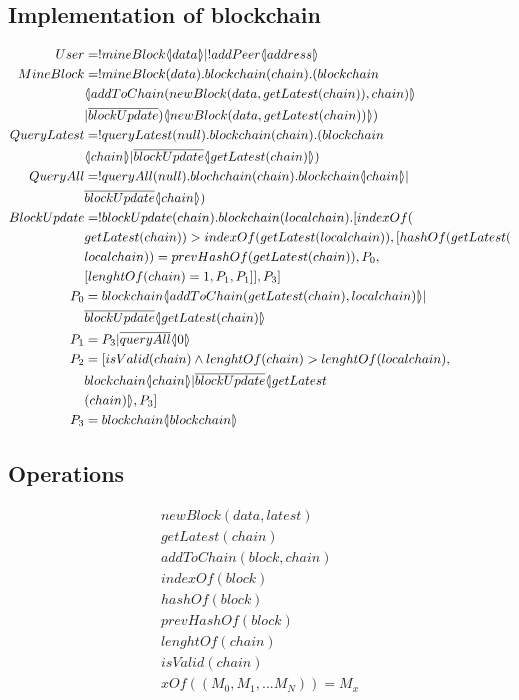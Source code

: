 \subsection{Implementation of blockchain}

\begin{align*}
    User &= !mineBlock \lift{}{data} |!addPeer\lift{}{address}\\
    MineBlock &= !mineBlock(data).blockchain(chain).(blockchain\\
        &\lift{}{addToChain(newBlock(data,getLatest(chain)),chain)}\\
        &|\overline{blockUpdate})\lift{}{newBlock(data, getLatest(chain))})\\
    QueryLatest &=!queryLatest(null).blockchain(chain).(blockchain\\
        &\lift{}{chain}|\overline{blockUpdate}\lift{}{getLatest(chain)})\\
        QueryAll &= !queryAll(null).blochchain(chain).blockchain\lift{}{chain}|\\
        &\overline{blockUpdate}\lift{}{chain})\\
    BlockUpdate &= !blockUpdate(chain).blockchain(localchain).[indexOf(\\
        &getLatest(chain))>indexOf(getLatest(localchain)),[hashOf(getLatest(\\
        &localchain))=prevHashOf(getLatest(chain)),P_0,\\
        &[lenghtOf(chain)=1,P_1,P_1]],P_3]\\
    P_0 &= blockchain\lift{}{addToChain(getLatest(chain),localchain)}|\\
        &\overline{blockUpdate}\lift{}{getLatest(chain)}\\
    P_1 &= P_3|\overline{queryAll}\lift{}{0}\\
    P_2 &= [isValid(chain) \land lenghtOf(chain) > lenghtOf(localchain),\\
        &blockchain\lift{}{chain}|\overline{blockUpdate}\lift{}{getLatest\\
        &(chain)},P_3]\\
    P_3 &= blockchain\lift{}{blockchain}
\end{align*}

\subsection{Operations}

\begin{align*}
    newBlock(data,latest)\\
    getLatest(chain)\\
    addToChain(block,chain)\\
    indexOf(block)\\
    hashOf(block)\\
    prevHashOf(block)\\
    lenghtOf(chain)\\
    isValid(chain)\\
    xOf((M_0,M_1,...M_N))=M_x
\end{align*}

